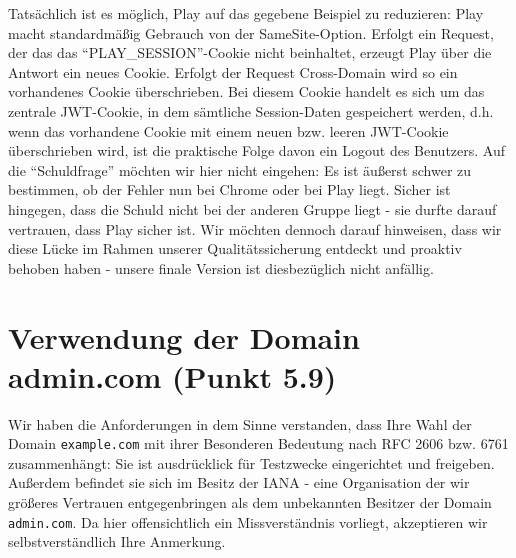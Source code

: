 \documentclass[12pt,DIV14,BCOR10mm,a4paper,parskip=half-,headsepline,headinclude,english,ngerman,bibliography=totocnumbered]{scrreprt}
\begin{document}
Tatsächlich ist es möglich, Play auf das gegebene Beispiel zu reduzieren: Play macht standardmäßig Gebrauch von der SameSite-Option. Erfolgt ein Request, der das das \enquote{PLAY\_SESSION}-Cookie nicht beinhaltet, erzeugt Play über die Antwort ein neues Cookie. Erfolgt der Request Cross-Domain wird so ein vorhandenes Cookie überschrieben. Bei diesem Cookie handelt es sich um das zentrale JWT-Cookie, in dem sämtliche Session-Daten gespeichert werden, d.h. wenn das vorhandene Cookie mit einem neuen bzw. leeren JWT-Cookie überschrieben wird, ist die praktische Folge davon ein Logout des Benutzers.\newline\newline
Auf die \enquote{Schuldfrage} möchten wir hier nicht eingehen: Es ist äußerst schwer zu bestimmen, ob der Fehler nun bei Chrome oder bei Play liegt. Sicher ist hingegen, dass die Schuld nicht bei der anderen Gruppe liegt - sie durfte darauf vertrauen, dass Play sicher ist. Wir möchten dennoch darauf hinweisen, dass wir diese Lücke im Rahmen unserer Qualitätssicherung entdeckt und proaktiv behoben haben - unsere finale Version ist diesbezüglich nicht anfällig.

\section{Verwendung der Domain admin.com (Punkt 5.9)}

Wir haben die Anforderungen in dem Sinne verstanden, dass Ihre Wahl der Domain \texttt{example.com} mit ihrer Besonderen Bedeutung nach RFC 2606 bzw. 6761 zusammenhängt: Sie ist ausdrücklick für Testzwecke eingerichtet und freigeben. Außerdem befindet sie sich im Besitz der IANA - eine Organisation der wir größeres Vertrauen entgegenbringen als dem unbekannten Besitzer der Domain \texttt{admin.com}.
Da hier offensichtlich ein Missverständnis vorliegt, akzeptieren wir selbstverständlich Ihre Anmerkung.



\printbibliography

\printacronyms[title=Abkürzungsverzeichnis,toctitle=Abkürzungsverzeichnis]
\printglossary[title=Glossar,toctitle=Glossar,type=main]

\iftotalfigures
  \listoffigures
\fi

\end{document}
